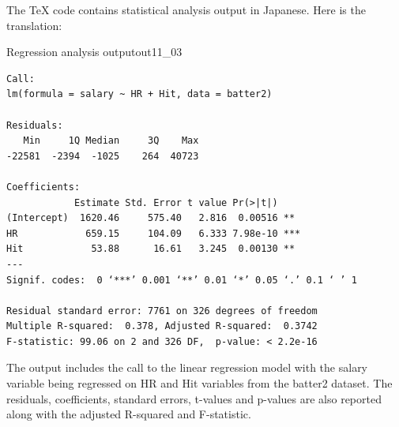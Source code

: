 The TeX code contains statistical analysis output in Japanese. Here is the translation:

\begin{Rscreen}{Regression analysis output}{out11_03}
	\begin{verbatim}
Call:
lm(formula = salary ~ HR + Hit, data = batter2)

Residuals:
   Min     1Q Median     3Q    Max 
-22581  -2394  -1025    264  40723 

Coefficients:
            Estimate Std. Error t value Pr(>|t|)    
(Intercept)  1620.46     575.40   2.816  0.00516 ** 
HR            659.15     104.09   6.333 7.98e-10 ***
Hit            53.88      16.61   3.245  0.00130 ** 
---
Signif. codes:  0 ‘***’ 0.001 ‘**’ 0.01 ‘*’ 0.05 ‘.’ 0.1 ‘ ’ 1

Residual standard error: 7761 on 326 degrees of freedom
Multiple R-squared:  0.378,	Adjusted R-squared:  0.3742 
F-statistic: 99.06 on 2 and 326 DF,  p-value: < 2.2e-16

\end{verbatim}
\end{Rscreen}

The output includes the call to the linear regression model with the salary variable being regressed on HR and Hit variables from the batter2 dataset. The residuals, coefficients, standard errors, t-values and p-values are also reported along with the adjusted R-squared and F-statistic.
